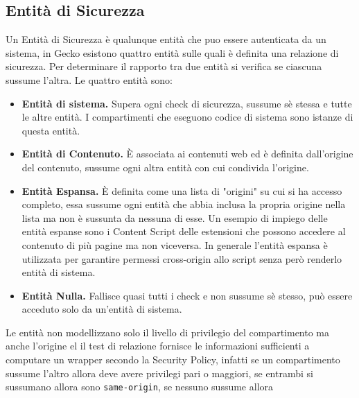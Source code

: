 \documentclass{sapthesis}
\newcommand{\code}[1]{\texttt{#1}}
\begin{document}
        \subsection{Entità di Sicurezza}
        \label{sec:security-principal}
            Un Entità di Sicurezza è qualunque entità che puo essere autenticata da un sistema, in Gecko
            esistono quattro entità sulle quali è definita una relazione di sicurezza.
            Per determinare il rapporto tra due entità si verifica se ciascuna sussume l'altra.
            Le quattro entità sono:
            \begin{itemize}
                \item \textbf{Entità di sistema.} Supera ogni check di sicurezza, sussume sè stessa e
                    tutte le altre entità. I compartimenti che eseguono codice di sistema sono istanze
                    di questa entità.

                \item \textbf{Entità di Contenuto.} È associata ai contenuti web ed è definita 
                    dall'origine del contenuto, sussume ogni altra entità con cui condivida
                    l'origine.

                \item \textbf{Entità Espansa.} È definita come una lista di "origini" su cui si ha accesso
                    completo, essa sussume ogni entità che abbia inclusa la propria origine nella lista
                    ma non è sussunta da nessuna di esse.
                    Un esempio di impiego delle entità espanse sono i Content Script delle estensioni che
                    possono accedere al contenuto di più pagine ma non viceversa. In generale l'entità
                    espansa è utilizzata per garantire permessi cross-origin allo script senza però
                    renderlo entità di sistema.

                \item \textbf{Entità Nulla.} Fallisce quasi tutti i check e non sussume sè stesso, può
                    essere acceduto solo da un'entità di sistema.
            \end{itemize}
            Le entità non modellizzano solo il livello di privilegio del compartimento ma anche l'origine
            el il test di relazione fornisce le informazioni sufficienti a computare un wrapper secondo
            la Security Policy, infatti se un compartimento sussume l'altro allora deve avere privilegi pari
            o maggiori, se entrambi si sussumano allora sono \code{same-origin}, se nessuno sussume allora
\end{document}
